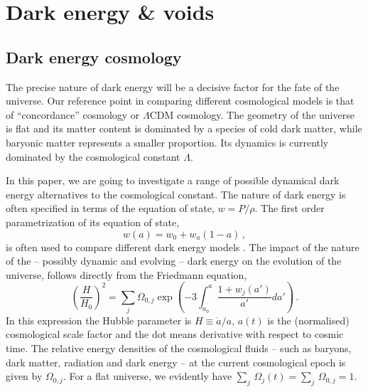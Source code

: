 \section{Dark energy \& voids}
\label{sec:theory}
\subsection{Dark energy cosmology}
\label{sec:cosmology}
The precise nature of dark energy will be a decisive factor for the fate of the universe.
Our reference point in comparing different cosmological models is that of ``concordance'' cosmology or $\Lambda$CDM 
cosmology. The geometry of the universe is flat and its matter content is dominated by a species of 
cold dark matter, while baryonic matter represents a smaller proportion. Its dynamics 
is currently dominated by the cosmological constant $\Lambda$.

In this paper, we are going to investigate a range of possible dynamical dark energy alternatives to the cosmological 
constant. The nature of dark energy is often specified in terms of the equation of state, $w=P/\rho$. The first order 
parametrization of its equation of state, 
\begin{equation}
\label{eqn:DEgeneralparam}
w(a) = w_0 + w_a(1-a) \,,
\end{equation}
is often used to compare different dark energy models \citep{chevallier01, linder03}.
The impact of the nature of the -- possibly dynamic and evolving -- dark energy on the evolution of the 
universe, follows directly from the Friedmann equation, 
\begin{equation}
	\label{eqn:friedmann}
	\left(\frac{H}{H_0} \right)^2 = \sum_j \Omega_{0,j} \exp\left( -3 \int_{a_0}^a \frac{1+w_j(a')}{a'} da' \right) \,.
\end{equation}
In this expression the Hubble parameter is $H \equiv \dot{a}/a$, $a(t)$ is the (normalised) cosmological scale factor and the dot means derivative with respect to cosmic time. 
The relative energy densities of the cosmological fluids -- such as baryons, dark matter, radiation and dark energy -- at 
the current cosmological epoch is given by $\Omega_{0,j}$. For a flat universe, we evidently have $\sum_j\,\Omega_j(t)=\sum_j\,\Omega_{0,j}=1$. 

